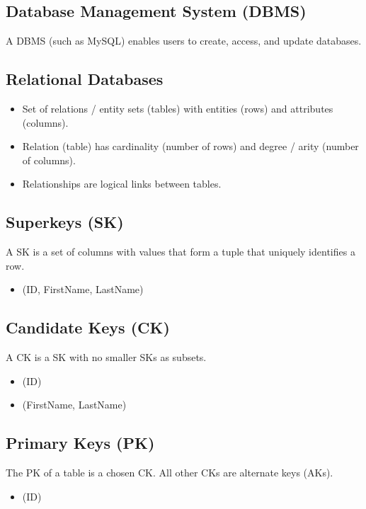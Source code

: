 \documentclass[11pt, a4paper]{article}
\begin{document}
    \subsection{Database Management System (DBMS)}
    A DBMS (such as MySQL) enables users to create, access, and update 
    databases. 

    \subsection{Relational Databases}
    \begin{itemize}
        \item Set of relations / entity sets (tables) with entities (rows) and 
        attributes (columns). 
        \item Relation (table) has cardinality (number of rows) and degree / 
        arity (number of columns). 
        \item Relationships are logical links between tables. 
    \end{itemize}

    \subsection{Superkeys (SK)}
    A SK is a set of columns with values that form a tuple that uniquely 
    identifies a row. 
    \begin{itemize}
        \item (ID, FirstName, LastName)
    \end{itemize}

    \subsection{Candidate Keys (CK)}
    A CK is a SK with no smaller SKs as subsets. 
    \begin{itemize}
        \item (ID)
        \item (FirstName, LastName)
    \end{itemize}

    \subsection{Primary Keys (PK)}
    The PK of a table is a chosen CK. All other CKs are alternate keys (AKs). 
    \begin{itemize}
        \item (ID)
    \end{itemize}
\end{document}
